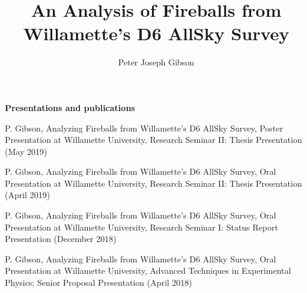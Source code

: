 \documentclass[12pt]{report}
\begin{document}
\title{An Analysis of Fireballs from Willamette's D6 AllSky Survey}
\author{Peter Joseph Gibson}

\maketitle


\newpage

\begin{center}
\textbf{Presentations and publications}

P. Gibson, Analyzing Fireballs from Willamette's D6 AllSky Survey, Poster Presentation at Willamette University, Research Seminar II: Thesis Presentation (May 2019)
\bigskip


P. Gibson, Analyzing Fireballs from Willamette's D6 AllSky Survey, Oral Presentation at Willamette University, Research Seminar II: Thesis Presentation (April 2019)
\bigskip

P. Gibson, Analyzing Fireballs from Willamette's D6 AllSky Survey, Oral Presentation at Willamette University, Research Seminar I: Status Report Presentation (December 2018)
\bigskip

P. Gibson, Analyzing Fireballs from Willamette's D6 AllSky Survey, Oral Presentation at Willamette University, Advanced Techniques in Experimental Physics: Senior Proposal Presentation (April 2018)

\end{center}



\begin{acknowledgments}

\end{acknowledgments}

\begin{abstract}

\end{abstract}

\tableofcontents
\listoffigures






%

%
%
%
\printbibliography

%
\end{document}
